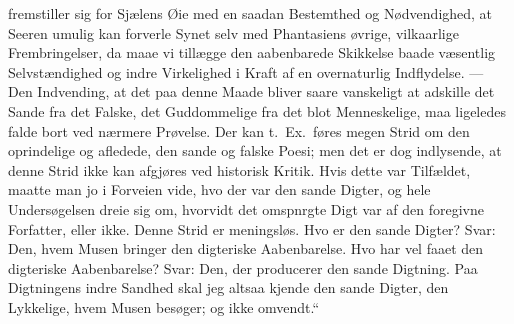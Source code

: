 \documentclass[12pt,a4paper]{book}
\begin{document}
fremstiller sig for Sjælens Øie med en saadan Bestemthed og Nødvendighed, at Seeren
umulig kan forverle Synet selv med Phantasiens øvrige, vilkaarlige Frembringelser, da
maae vi tillægge den aabenbarede Skikkelse baade væsentlig Selvstændighed og indre
Virkelighed i Kraft af en overnaturlig Indflydelse. --- Den Indvending, at det paa denne
Maade bliver saare vanskeligt at adskille det Sande fra det Falske, det Guddommelige fra
det blot Menneskelige, maa ligeledes falde bort ved nærmere Prøvelse. Der kan t.\ Ex.\
føres megen Strid om den oprindelige og afledede, den sande og falske Poesi;
men det er dog indlysende, at denne Strid ikke kan afgjøres ved historisk Kritik. Hvis
dette var Tilfældet, maatte man jo i Forveien vide, hvo der var den sande Digter, og hele
Undersøgelsen dreie sig om, hvorvidt det omspnrgte Digt var af den foregivne Forfatter,
eller ikke. Denne Strid er meningsløs. Hvo er den sande Digter? Svar: Den, hvem Musen
bringer den digteriske Aabenbarelse. Hvo har vel faaet den digteriske Aabenbarelse?
Svar: Den, der producerer den sande Digtning. Paa Digtningens indre Sandhed skal jeg
altsaa kjende den sande Digter, den Lykkelige, hvem Musen besøger; og ikke omvendt.“
\end{document}
